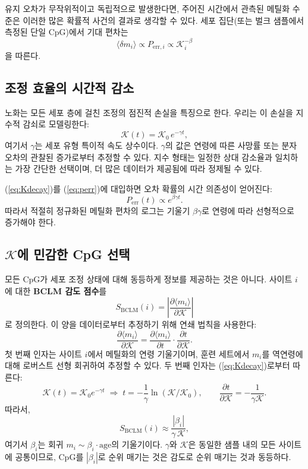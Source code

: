 \documentclass[12pt,a4paper]{article}
\newcommand{\REL}{\mathcal{K}}          %
\begin{document}
	유지 오차가 무작위적이고 독립적으로 발생한다면, 주어진 시간에서 관측된 메틸화 수준은 이러한 많은 확률적 사건의 결과로 생각할 수 있다. 세포 집단(또는 벌크 샘플에서 측정된 단일 CpG)에서 기대 편차는
	\[
	\langle \delta m_i \rangle \propto P_{\mathrm{err},i} \propto \REL_i^{-\beta}
	\]
	을 따른다.
	
	\subsection{조정 효율의 시간적 감소}
	노화는 모든 세포 층에 걸친 조정의 점진적 손실을 특징으로 한다. 우리는 이 손실을 지수적 감쇠로 모델링한다:
	\begin{equation}
		\REL(t) = \REL_0 \, e^{-\gamma t},
		\label{eq:Kdecay}
	\end{equation}
	여기서 \(\gamma\)는 세포 유형 특이적 속도 상수이다. \(\gamma\)의 값은 연령에 따른 사망률 또는 분자 오차의 관찰된 증가로부터 추정할 수 있다. 지수 형태는 일정한 상대 감소율과 일치하는 가장 간단한 선택이며, 더 많은 데이터가 제공됨에 따라 정제될 수 있다.
	
	(\ref{eq:Kdecay})를 (\ref{eq:perr})에 대입하면 오차 확률의 시간 의존성이 얻어진다:
	\[
	P_{\mathrm{err}}(t) \propto e^{\beta\gamma t}.
	\]
	따라서 적절히 정규화된 메틸화 편차의 로그는 기울기 \(\beta\gamma\)로 연령에 따라 선형적으로 증가해야 한다.
	
	\subsection{\(\REL\)에 민감한 CpG 선택}
	모든 CpG가 세포 조정 상태에 대해 동등하게 정보를 제공하는 것은 아니다. 사이트 \(i\)에 대한 \textbf{BCLM 감도 점수}를
	\begin{equation}
		S_{\mathrm{BCLM}}(i) = \left| \frac{\partial \langle m_i \rangle}{\partial \REL} \right|
		\label{eq:sensitivity}
	\end{equation}
	로 정의한다. 이 양을 데이터로부터 추정하기 위해 연쇄 법칙을 사용한다:
	\[
	\frac{\partial \langle m_i \rangle}{\partial \REL} = \frac{\partial \langle m_i \rangle}{\partial t} \cdot \frac{\partial t}{\partial \REL}.
	\]
	첫 번째 인자는 사이트 \(i\)에서 메틸화의 연령 기울기이며, 훈련 세트에서 \(m_i\)를 역연령에 대해 로버스트 선형 회귀하여 추정할 수 있다. 두 번째 인자는 (\ref{eq:Kdecay})로부터 따른다:
	\[
	\REL(t) = \REL_0 e^{-\gamma t} \;\Longrightarrow\; t = -\frac{1}{\gamma}\ln(\REL/\REL_0),\qquad
	\frac{\partial t}{\partial \REL} = -\frac{1}{\gamma \REL}.
	\]
	따라서,
	\[
	S_{\mathrm{BCLM}}(i) \approx \frac{|\beta_i|}{\gamma \, \REL},
	\]
	여기서 \(\beta_i\)는 회귀 \(m_i \sim \beta_i \cdot \text{age}\)의 기울기이다. \(\gamma\)와 \(\REL\)은 동일한 샘플 내의 모든 사이트에 공통이므로, CpG를 \(|\beta_i|\)로 순위 매기는 것은 감도로 순위 매기는 것과 동등하다.
	
\end{document}
